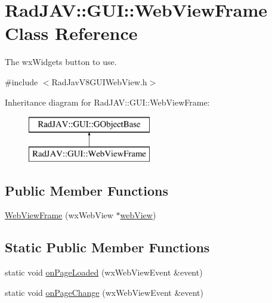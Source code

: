 \hypertarget{class_rad_j_a_v_1_1_g_u_i_1_1_web_view_frame}{}\section{Rad\+J\+AV\+:\+:G\+UI\+:\+:Web\+View\+Frame Class Reference}
\label{class_rad_j_a_v_1_1_g_u_i_1_1_web_view_frame}


The wx\+Widgets button to use.  




{\ttfamily \#include $<$Rad\+Jav\+V8\+G\+U\+I\+Web\+View.\+h$>$}

Inheritance diagram for Rad\+J\+AV\+:\+:G\+UI\+:\+:Web\+View\+Frame\+:\begin{figure}[H]
\begin{center}
\leavevmode
\includegraphics[height=2.000000cm]{class_rad_j_a_v_1_1_g_u_i_1_1_web_view_frame}
\end{center}
\end{figure}
\subsection*{Public Member Functions}
\begin{DoxyCompactItemize}
\item 
\mbox{\hyperlink{class_rad_j_a_v_1_1_g_u_i_1_1_web_view_frame_a2b6c578a8032f2495214e471188c1451}{Web\+View\+Frame}} (wx\+Web\+View $\ast$\mbox{\hyperlink{class_rad_j_a_v_1_1_g_u_i_1_1_web_view_frame_a3073b6697ea6df43d448496798a43805}{web\+View}})
\end{DoxyCompactItemize}
\subsection*{Static Public Member Functions}
\begin{DoxyCompactItemize}
\item 
static void \mbox{\hyperlink{class_rad_j_a_v_1_1_g_u_i_1_1_web_view_frame_a4794cc7deb1d0c139fb32e2284e16f01}{on\+Page\+Loaded}} (wx\+Web\+View\+Event \&event)
\item 
static void \mbox{\hyperlink{class_rad_j_a_v_1_1_g_u_i_1_1_web_view_frame_a720ed24c21ac13ac475aa4a32d0426f8}{on\+Page\+Change}} (wx\+Web\+View\+Event \&event)
\end{DoxyCompactItemize}
